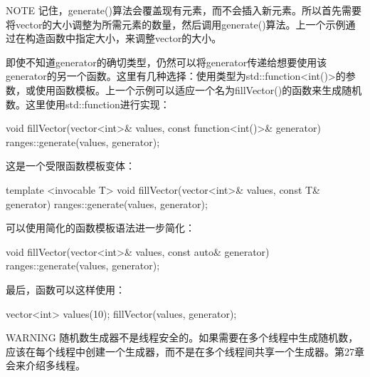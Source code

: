 \begin{myNotic}{NOTE}
记住，generate()算法会覆盖现有元素，而不会插入新元素。所以首先需要将vector的大小调整为所需元素的数量，然后调用generate()算法。上一个示例通过在构造函数中指定大小，来调整vector的大小。
\end{myNotic}

即使不知道generator的确切类型，仍然可以将generator传递给想要使用该generator的另一个函数。这里有几种选择：使用类型为std::function<int()>的参数，或使用函数模板。上一个示例可以适应一个名为fillVector()的函数来生成随机数。这里使用std::function进行实现：

\begin{cpp}
void fillVector(vector<int>& values, const function<int()>& generator)
{
    ranges::generate(values, generator);
}
\end{cpp}

这是一个受限函数模板变体：

\begin{cpp}
template <invocable T>
void fillVector(vector<int>& values, const T& generator)
{
    ranges::generate(values, generator);
}
\end{cpp}

可以使用简化的函数模板语法进一步简化：

\begin{cpp}
void fillVector(vector<int>& values, const auto& generator)
{
    ranges::generate(values, generator);
}
\end{cpp}

最后，函数可以这样使用：

\begin{cpp}
vector<int> values(10);
fillVector(values, generator);
\end{cpp}

\begin{myWarning}{WARNING}
随机数生成器不是线程安全的。如果需要在多个线程中生成随机数，应该在每个线程中创建一个生成器，而不是在多个线程间共享一个生成器。第27章会来介绍多线程。
\end{myWarning}








